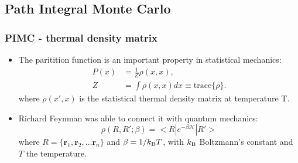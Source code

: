 \documentclass[xcolor=svgnames]{beamer}
\DeclareRobustCommand{\mc}[1]{\mathcal{#1}}
\begin{document}
	\subsection{Path Integral Monte Carlo}
        \begin{frame}
            \frametitle{PIMC - thermal density matrix}
            \begin{itemize}
                \justifying
                \item The paritition function is an important property in statistical mechanics:
                \begin{equation*}
                    \begin{aligned}
                        P(x) &= \frac{1}{Z} \rho(x,x),\\
                        Z &= \int \rho(x,x) dx \equiv \text{trace} \{\rho\}.
                    \end{aligned}
                \end{equation*}
                where $\rho(x',x)$ is the statistical thermal density matrix at temperature T.
                \item Richard Feynman was able to connect it with quantum mechanics:
                \begin{equation*}\label{eq:rho}
                    \rho (R , R' ; \beta) = < R | e^{- \beta \mc{H} } | R' >
                \end{equation*}
                where $R = \{\bm{r}_1, \bm{r}_2, \ldots \bm{r}_n\}$ and $\beta = 1/k_{\rm B}T$, with $k_{\rm B}$ Boltzmann's constant and $T$ the temperature.
            \end{itemize}
        \end{frame}
\end{document}
